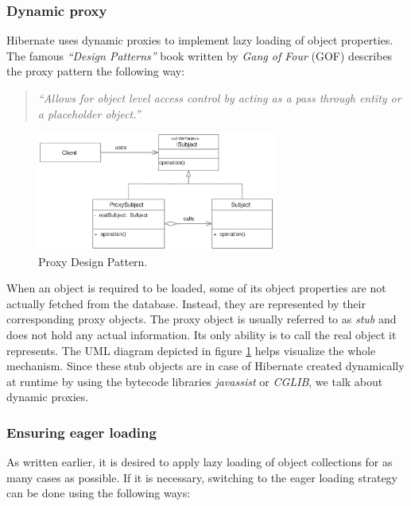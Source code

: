 \documentclass[12pt, oneside, a4paper]{book}
\begin{document}
\subsubsection{Dynamic proxy}

Hibernate uses dynamic proxies to implement lazy loading of object properties. 
The famous \textit{``Design Patterns''} book written by \textit{Gang of Four} (GOF) \cite{GOF:DesignPatterns} describes the proxy pattern the following way:

\begin{quote}		
\textit{``Allows for object level access control by acting as a pass through entity or a placeholder object.''}
\end{quote}


\begin{figure}[h]
	\centering
		\includegraphics[width=0.7\textwidth]{figures/proxy.eps}
	\caption{Proxy Design Pattern.}
	\label{fig:proxy}
\end{figure}


When an object is required to be loaded, some of its object properties are not actually fetched from the database. Instead, they are represented by their corresponding proxy objects. 
The proxy object is usually referred to as \textit{stub} and does not hold any actual information. 
Its only ability is to call the real object it represents. The UML diagram depicted in figure \ref{fig:proxy} helps visualize the whole mechanism.
Since these stub objects are in case of Hibernate created dynamically at runtime by using the bytecode libraries \textit{javassist} or \textit{CGLIB}, we talk about dynamic proxies. 


\subsubsection{Ensuring eager loading}

As written earlier, it is desired to apply lazy loading of object collections for as many cases as possible. If it is necessary, switching to the eager loading strategy can be done using the following ways:
\end{document}
